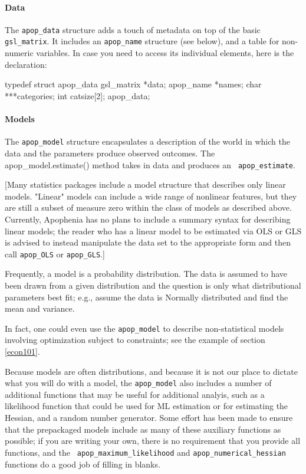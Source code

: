\paragraph{Data}
The {\tt apop\_data} structure adds a touch of metadata on top of the
basic {\tt gsl\_matrix}. It includes an {\tt apop\_name} structure (see
below), and a table for non-numeric variables. In case you need to access
its individual elements, here is the declaration:

typedef struct apop_data{
    gsl_matrix  *data;
    apop_name   *names;
    char        ***categories;
    int         catsize[2];
} apop_data;

\paragraph{Models}
The {\tt apop\_model} structure encapsulates a description of the world
in which the data and the parameters produce observed outcomes. The
apop\_model.estimate() method takes in data and produces an {\tt
apop\_estimate}. 

[Many statistics packages include a model structure that describes only
linear models.  "Linear" models can include a wide range of nonlinear
features, but they are still a subset of measure zero within the class of
models as described above. Currently, Apophenia has no plans to include
a summary syntax for describing linear models; the reader who has a linear
model to be estimated via OLS or GLS is advised to instead manipulate
the data set to the appropriate form and then call {\tt apop\_\-OLS} or
{\tt apop\_\-GLS}.]

Frequently, a model is a probability distribution. The data is assumed
to have been drawn from a given distribution and the question is
only what distributional parameters best fit; e.g., assume the data
is Normally distributed and find the mean and variance.

In fact, one could even use the {\tt apop\_\-model} to describe 
non-statistical models involving optimization subject to constraints;
see the example of section \ref{econ101}.

Because models are often distributions, and because it is not our place
to dictate what you will do with a model, the {\tt apop\_\-model} also includes a
number of additional functions that may be useful for additional analyis,
such as a likelihood function that could be used for ML estimation or
for estimating the Hessian, and a random number generator. Some effort
has been made to ensure that the prepackaged models include as many of
these auxiliary functions as possible; if you are writing your own,
there is no requirement that you provide all functions, and the {\tt
apop\_\-maximum\_\-likelihood} and {\tt apop\_\-numerical\_\-hessian}
functions do a good job of filling in blanks.

